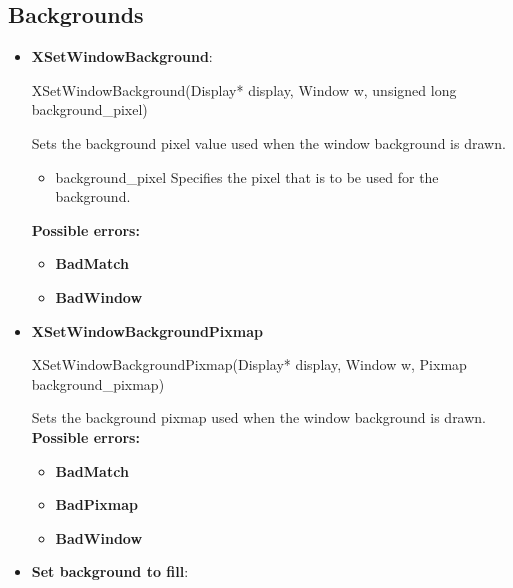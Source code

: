 \documentclass{report}
\begin{document}
    \subsection{Backgrounds}
    \begin{itemize}
        \item \textbf{XSetWindowBackground}:
            \bigbreak \noindent 
            \begin{cppcode}
                XSetWindowBackground(Display* display, Window w, unsigned long background_pixel)
            \end{cppcode}
            \bigbreak \noindent
            Sets the background pixel value used when the window background is drawn.
            \begin{itemize}
                \item background\_pixel Specifies the pixel that is to be used for the background.
            \end{itemize}
            \bigbreak \noindent
            \textbf{Possible errors:}
            \begin{itemize}
                \item \textbf{BadMatch}
                \item \textbf{BadWindow}
            \end{itemize}

        \item \textbf{XSetWindowBackgroundPixmap}
            \bigbreak \noindent 
            \begin{cppcode}
                XSetWindowBackgroundPixmap(Display* display, Window w, Pixmap background_pixmap)
            \end{cppcode}
            \bigbreak \noindent
            Sets the background pixmap used when the window background is drawn.
            \bigbreak \noindent
            \textbf{Possible errors:}
            \begin{itemize}
                \item \textbf{BadMatch}
                \item \textbf{BadPixmap}
                \item \textbf{BadWindow}
            \end{itemize}

        \item \textbf{Set background to fill}: 
    \end{itemize}

    \pagebreak 
\end{document}

